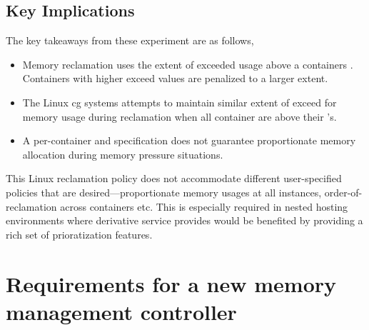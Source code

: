     \subsection{Key Implications}
    The key takeaways from these experiment are as follows,
      \begin{itemize}
      \item Memory reclamation uses the extent of exceeded usage above a containers \sol{}.
      Containers with higher exceed values are penalized to a larger extent.
      \item The Linux cg{} systems attempts to maintain similar extent of exceed for
      memory usage during reclamation when all container are above their \sol's.
      \item A per-container \sol{} and \hl{} specification does not guarantee proportionate
      memory allocation during memory pressure situations.
      \end{itemize}
      This Linux \cg{} reclamation policy does not accommodate different user-specified policies
      that are desired---proportionate memory usages at all instances,
      order-of-reclamation across containers etc. This is especially required in nested
      hosting environments where derivative service provides would be benefited
      by providing a rich set of prioratization features.
    
  \section{Requirements for a new memory management controller}
  
